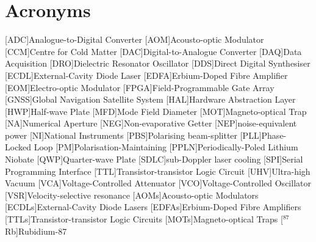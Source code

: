 


\chapter*{Acronyms}
\begin{acronym}
        [ADC]{Analogue-to-Digital Converter}
        [AOM]{Acousto-optic Modulator}
        [CCM]{Centre for Cold Matter}
        [DAC]{Digital-to-Analogue Converter}
        [DAQ]{Data Acquisition}
        [DRO]{Dielectric Resonator Oscillator}
        [DDS]{Direct Digital Synthesiser}
        [ECDL]{External-Cavity Diode Laser}
        [EDFA]{Erbium-Doped Fibre Amplifier}
        [EOM]{Electro-optic Modulator}
        [FPGA]{Field-Programmable Gate Array}
        [GNSS]{Global Navigation Satellite System}
        [HAL]{Hardware Abstraction Layer}
        [HWP]{Half-wave Plate}
        [MFD]{Mode Field Diameter}
        [MOT]{Magneto-optical Trap}
        [NA]{Numerical Aperture}
        [NEG]{Non-evaporative Getter}
        [NEP]{noise-equivalent power}
        [NI]{National Instruments}
        [PBS]{Polarising beam-splitter}
        [PLL]{Phase-Locked Loop}
        [PM]{Polarisation-Maintaining}
        [PPLN]{Periodically-Poled Lithium Niobate}
        [QWP]{Quarter-wave Plate}
        [SDLC]{sub-Doppler laser cooling}
        [SPI]{Serial Programming Interface}
        [TTL]{Transistor-transistor Logic Circuit}
        [UHV]{Ultra-high Vacuum}
        [VCA]{Voltage-Controlled Attenuator}
        [VCO]{Voltage-Controlled Oscillator}
        [VSR]{Velocity-selective resonance}
        [AOMs]{Acousto-optic Modulators}
        [ECDLs]{External-Cavity Diode Lasers}
        [EDFAs]{Erbium-Doped Fibre Amplifiers}
        [TTLs]{Transistor-transistor Logic Circuits}
        [MOTs]{Magneto-optical Traps}
        [\(^{87}\)Rb]{Rubidium-87}
    \end{acronym}

